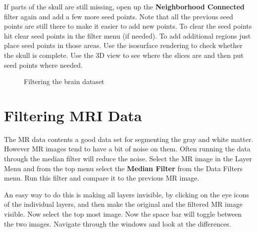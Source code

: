 \documentclass[fleqn,11pt,openany]{book}
\begin{document}
If parts of the skull are still missing, open up the {\bf Neighborhood Connected} filter again and add a few more seed points. Note that all the previous seed points are still there to make it easier to add new points. To clear the seed points hit clear seed points in the filter menu (if needed). To add additional regions just place seed points in those areas. Use the isosurface rendering to check whether the skull is complete. Use the 3D view to see where the slices are and then put seed points where needed.


\begin{figure}
\caption{Filtering the brain dataset}\label{fig:Median-ImageCorrected}
\end{figure}


\section{Filtering MRI Data}

The MR data contents a good data set for segmenting the gray and white matter. However MR images  tend to have a bit of noise on them. Often running the data through the median filter will reduce the noise. Select the MR image in the Layer Menu and  from the top menu select the {\bf Median Filter} from the Data Filters menu. Run this filter and compare it to the previous MR image.

An easy way to do this is making all layers invisible, by clicking on the eye icons of the individual layers, and then make the original and the filtered MR image visible. Now select the top most image. Now the space bar will toggle between the two images. Navigate through the windows and look at the differences.
\end{document}

